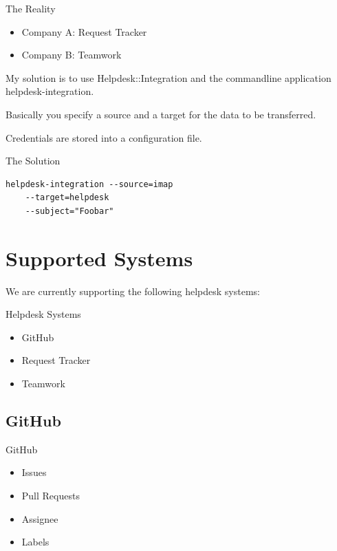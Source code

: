 \begin{frame}{The Reality}
\begin{itemize} 
\item Company A: Request Tracker
\item Company B: Teamwork
\end{itemize}
\end{frame}

My solution is to use Helpdesk::Integration and the commandline
application helpdesk-integration.

Basically you specify a source and a target for the data to be
transferred.

Credentials are stored into a configuration file.

\begin{frame}[fragile]{The Solution}
\begin{lstlisting}
helpdesk-integration --source=imap 
    --target=helpdesk 
    --subject="Foobar"
\end{lstlisting}
\end{frame}

\section{Supported Systems}

We are currently supporting the following helpdesk systems:

\begin{frame}{Helpdesk Systems}
\begin{itemize}
\item GitHub
\item Request Tracker
\item Teamwork
\end{itemize}
\end{frame}

\subsection{GitHub}



\begin{frame}{GitHub}
\begin{itemize}
\item Issues
\item Pull Requests
\item Assignee
\item Labels
\end{itemize}
\end{frame}

